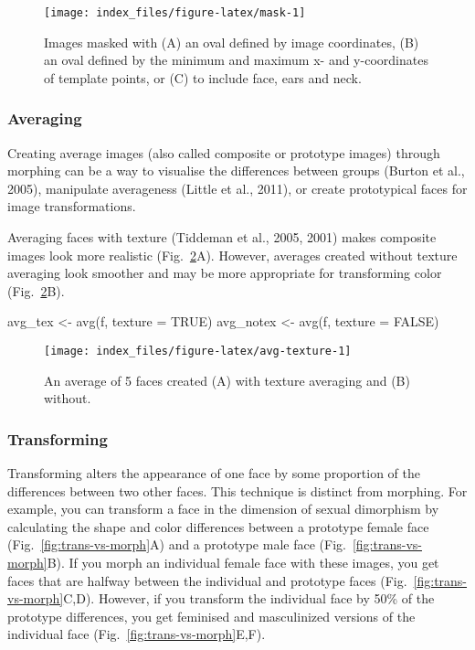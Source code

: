 \documentclass[
  doc,floatsintext]{apa6}
\newenvironment{Shaded}{\begin{snugshade}}{\end{snugshade}}
\newcommand{\AttributeTok}[1]{\textcolor[rgb]{0.77,0.63,0.00}{#1}}
\newcommand{\ConstantTok}[1]{\textcolor[rgb]{0.00,0.00,0.00}{#1}}
\newcommand{\FunctionTok}[1]{\textcolor[rgb]{0.00,0.00,0.00}{#1}}
\newcommand{\NormalTok}[1]{#1}
\newcommand{\OtherTok}[1]{\textcolor[rgb]{0.56,0.35,0.01}{#1}}
\begin{document}
\begin{figure}
\texttt{[image: index\_files/figure-latex/mask-1]} \caption{Images masked with (A) an oval defined by image coordinates, (B) an oval defined by the minimum and maximum x- and y-coordinates of template points, or (C) to include face, ears and neck.}\label{fig:mask}
\end{figure}

\hypertarget{averaging}{%
\subsubsection{Averaging}\label{averaging}}

Creating average images (also called composite or prototype images) through morphing can be a way to visualise the differences between groups (Burton et al., 2005), manipulate averageness (Little et al., 2011), or create prototypical faces for image transformations.

Averaging faces with texture (Tiddeman et al., 2005, 2001) makes composite images look more realistic (Fig.~\ref{fig:avg-texture}A). However, averages created without texture averaging look smoother and may be more appropriate for transforming color (Fig.~\ref{fig:avg-texture}B).

\begin{Shaded}
\begin{Highlighting}[]
\NormalTok{avg\_tex }\OtherTok{\textless{}{-}} \FunctionTok{avg}\NormalTok{(f, }\AttributeTok{texture =} \ConstantTok{TRUE}\NormalTok{)}
\NormalTok{avg\_notex }\OtherTok{\textless{}{-}} \FunctionTok{avg}\NormalTok{(f, }\AttributeTok{texture =} \ConstantTok{FALSE}\NormalTok{)}
\end{Highlighting}
\end{Shaded}

\begin{figure}
\texttt{[image: index\_files/figure-latex/avg-texture-1]} \caption{An average of 5 faces created (A) with texture averaging and (B) without.}\label{fig:avg-texture}
\end{figure}

\hypertarget{transforming}{%
\subsubsection{Transforming}\label{transforming}}

Transforming alters the appearance of one face by some proportion of the differences between two other faces. This technique is distinct from morphing. For example, you can transform a face in the dimension of sexual dimorphism by calculating the shape and color differences between a prototype female face (Fig.~\ref{fig:trans-vs-morph}A) and a prototype male face (Fig.~\ref{fig:trans-vs-morph}B). If you morph an individual female face with these images, you get faces that are halfway between the individual and prototype faces (Fig.~\ref{fig:trans-vs-morph}C,D). However, if you transform the individual face by 50\% of the prototype differences, you get feminised and masculinized versions of the individual face (Fig.~\ref{fig:trans-vs-morph}E,F).
\end{document}
